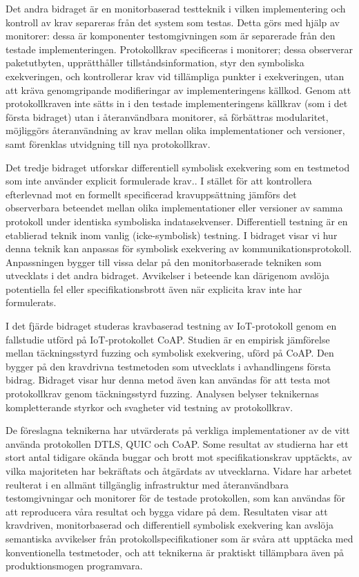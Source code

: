 Det andra bidraget är en monitorbaserad testteknik i vilken implementering och kontroll av krav separeras från det system som testas. Detta görs med hjälp av monitorer: dessa är komponenter testomgivningen som är separerade från den testade implementeringen.
Protokollkrav specificeras i monitorer; dessa observerar paketutbyten, upprätthåller tillståndsinformation, styr den symboliska exekveringen, och kontrollerar krav vid tillämpliga punkter i exekveringen, utan att kräva genomgripande modifieringar av implementeringens källkod.
Genom att protokollkraven inte sätts in i den testade implementeringens källkrav (som i det första bidraget) utan i återanvändbara monitorer,
så förbättras modularitet, möjliggörs återanvändning av krav mellan olika implementationer och versioner, samt förenklas utvidgning till nya protokollkrav.

Det tredje bidraget utforskar differentiell symbolisk exekvering som en testmetod som inte använder explicit formulerade krav.. 
I stället för att kontrollera efterlevnad mot en formellt specificerad kravuppsättning jämförs det observerbara beteendet mellan olika implementationer eller versioner av samma protokoll under identiska symboliska indatasekvenser. Differentiell testning är en etablierad teknik inom vanlig (icke-symbolisk) testning. I bidraget visar vi hur denna teknik kan anpassas för symbolisk exekvering av kommunikationsprotokoll. Anpassningen bygger till vissa delar på den monitorbaserade tekniken som utvecklats i det andra bidraget. Avvikelser i beteende kan därigenom avslöja potentiella fel eller specifikationsbrott även när explicita krav inte har formulerats.

I det fjärde bidraget studeras kravbaserad testning av IoT-protokoll genom en fallstudie utförd på IoT-protokollet CoAP.
Studien är en empirisk jämförelse mellan täckningsstyrd fuzzing och symbolisk exekvering, uförd på CoAP. Den bygger på den kravdrivna testmetoden som utvecklats i avhandlingens första bidrag. Bidraget visar hur denna metod även kan användas för att testa mot protokollkrav genom täckningsstyrd fuzzing.
Analysen belyser teknikernas kompletterande styrkor och svagheter vid testning av protokollkrav.

De föreslagna teknikerna har utvärderats på verkliga implementationer av de vitt använda protokollen DTLS, QUIC och CoAP. 
Some resultat av studierna har ett stort antal tidigare okända buggar och brott mot specifikationskrav upptäckts, av vilka majoriteten har bekräftats och åtgärdats av utvecklarna.
Vidare har arbetet reulterat i en allmänt tillgänglig infrastruktur med återanvändbara testomgivningar och monitorer för de testade protokollen, som kan användas för att reproducera våra resultat och bygga vidare på dem.
Resultaten visar att kravdriven, monitorbaserad och differentiell symbolisk exekvering kan avslöja semantiska avvikelser från protokollspecifikationer som är svåra att upptäcka med konventionella testmetoder, och att teknikerna är praktiskt tillämpbara även på produktionsmogen programvara.

